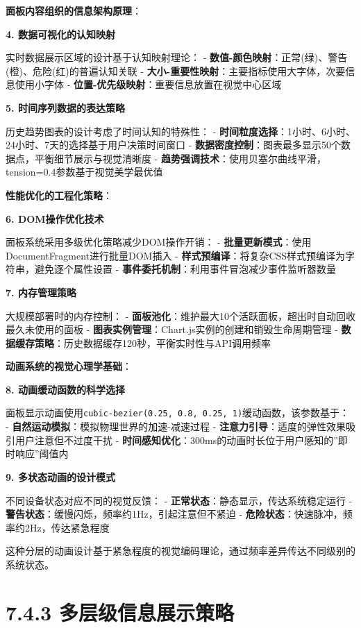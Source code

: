\textbf{面板内容组织的信息架构原理}：

\textbf{4. 数据可视化的认知映射}

实时数据展示区域的设计基于认知映射理论： - \textbf{数值-颜色映射}：正常(绿)、警告(橙)、危险(红)的普遍认知关联 - \textbf{大小-重要性映射}：主要指标使用大字体，次要信息使用小字体 - \textbf{位置-优先级映射}：重要信息放置在视觉中心区域

\textbf{5. 时间序列数据的表达策略}

历史趋势图表的设计考虑了时间认知的特殊性： - \textbf{时间粒度选择}：1小时、6小时、24小时、7天的选择基于用户决策时间窗口 - \textbf{数据密度控制}：图表最多显示50个数据点，平衡细节展示与视觉清晰度 - \textbf{趋势强调技术}：使用贝塞尔曲线平滑，tension=0.4参数基于视觉美学最优值

\textbf{性能优化的工程化策略}：

\textbf{6. DOM操作优化技术}

面板系统采用多级优化策略减少DOM操作开销： - \textbf{批量更新模式}：使用DocumentFragment进行批量DOM插入 - \textbf{样式预编译}：将复杂CSS样式预编译为字符串，避免逐个属性设置 - \textbf{事件委托机制}：利用事件冒泡减少事件监听器数量

\textbf{7. 内存管理策略}

大规模部署时的内存控制： - \textbf{面板池化}：维护最大10个活跃面板，超出时自动回收最久未使用的面板 - \textbf{图表实例管理}：Chart.js实例的创建和销毁生命周期管理 - \textbf{数据缓存策略}：历史数据缓存120秒，平衡实时性与API调用频率

\textbf{动画系统的视觉心理学基础}：

\textbf{8. 动画缓动函数的科学选择}

面板显示动画使用\texttt{cubic-bezier(0.25, 0.8, 0.25, 1)}缓动函数，该参数基于： - \textbf{自然运动模拟}：模拟物理世界的加速-减速过程 - \textbf{注意力引导}：适度的弹性效果吸引用户注意但不过度干扰 - \textbf{时间感知优化}：300ms的动画时长位于用户感知的''即时响应''阈值内

\textbf{9. 多状态动画的设计模式}

不同设备状态对应不同的视觉反馈： - \textbf{正常状态}：静态显示，传达系统稳定运行 - \textbf{警告状态}：缓慢闪烁，频率约1Hz，引起注意但不紧迫 - \textbf{危险状态}：快速脉冲，频率约2Hz，传达紧急程度

这种分层的动画设计基于紧急程度的视觉编码理论，通过频率差异传达不同级别的系统状态。

\section{7.4.3 多层级信息展示策略}

